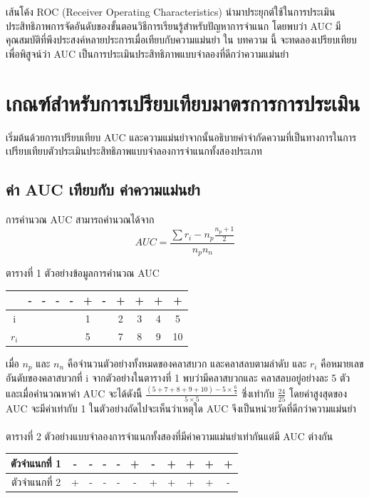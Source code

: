 \documentclass[twoside, twocolumn, 12pt]{article}
\begin{document}
เส้นโค้ง ROC (Receiver Operating Characteristics) นำมาประยุกต์ใช้ในการประเมินประสิทธิภาพ\cite{2, 3}การจัดอันดับของขั้นตอนวิธีการเรียนรู้สำหรับปัญหาการจำแนก \cite{4, 5} โดยพบว่า AUC มีคุณสมบัติที่พึงประสงค์หลายประการเมื่อเทียบกับความแม่นยำ \cite{6}
ใน บทความ นี้ จะทดลองเปรียบเทียบเพื่อพิสูจน์ว่า AUC เป็นการประเมินประสิทธิภาพแบบจำลองที่ดีกว่าความแม่นยำ

\section{เกณฑ์สำหรับการเปรียบเทียบมาตรการการประเมิน}
\quad เริ่มต้นด้วยการเปรียบเทียบ AUC และความแม่นยำจากนั้นอธิบายคำจำกัดความที่เป็นทางการในการเปรียบเทียบตัวประเมินประสิทธิภาพแบบจำลองการจำแนกทั้งสองประเภท
\subsection{ค่า AUC เทียบกับ ค่าความแม่นยำ}
\quad การคำนวณ AUC สามารถคำนวณได้จาก\cite{7}
\begin{equation}
AUC = \frac{\sum r_i-n_p\frac{n_p + 1}{2}}{n_pn_n}
\end{equation}
\begin{center} ตารางที่ 1 ตัวอย่างข้อมูลการคำนวณ AUC \end{center}
\begin{center}
\begin{tabular}{ccccccccccc}
  &-&-&-&-&+&-&+&+&+&+ \\
  \hline
  i&&&&&1&&2&3&4&5 \\
  $r_i$& & & & & 5&&7&8&9&10\\
  \hline  
\end{tabular}
\end{center}

เมื่อ $n_p$ และ $n_n$ คือจำนวนตัวอย่างทั้งหมดของคลาสบวก และคลาสลบตามลำดับ และ $r_i$ คือหมายเลขอันดับของคลาสบวกที่ i จากตัวอย่างในตารางที่ 1 พบว่ามีคลาสบวกและ คลาสลบอยู่อย่างละ 5 ตัว และเมื่อคำนวณหาค่า AUC จะได้ดังนี้ $\frac{(5+7+8+9+10)- 5\times\frac{6}{2}}{5\times5}$ ซึ่งเท่ากับ $\frac{24}{25}$ โดยค่าสูงสุดของ AUC จะมีค่าเท่ากับ 1 ในตัวอย่างถัดไปจะเห็นว่าเหตุใด AUC จึงเป็นหน่วยวัดที่ดีกว่าความแม่นยำ\\\\
ตารางที่ 2 ตัวอย่างแบบจำลองการจำแนกทั้งสองที่มีค่าความแม่นยำเท่ากันแต่มี AUC ต่างกัน
\begin{center}
\begin{tabular}{|c|ccccc|ccccc|}
  \hline
  ตัวจำแนกที่ 1 &-& -& -& -& +& -& +& +& +& +\\
  \hline
  ตัวจำแนกที่ 2 & +& -& -& -& -& +& +& +& +& -\\
  \hline  
\end{tabular}
\end{center}
\end{document}
